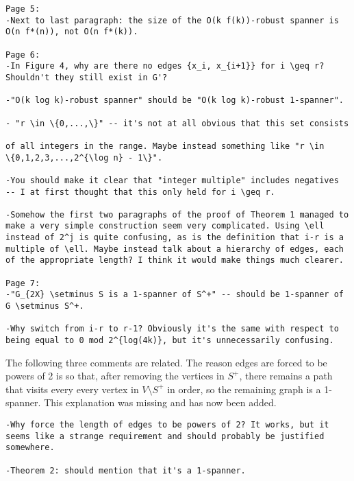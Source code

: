 \documentclass{patmorin}
\begin{document}
\begin{Verbatim}[frame=single]
Page 5:
-Next to last paragraph: the size of the O(k f(k))-robust spanner is
O(n f*(n)), not O(n f*(k)).

Page 6:
-In Figure 4, why are there no edges {x_i, x_{i+1}} for i \geq r?
Shouldn't they still exist in G'?

-"O(k log k)-robust spanner" should be "O(k log k)-robust 1-spanner".

- "r \in \{0,...,\}" -- it's not at all obvious that this set consists

of all integers in the range. Maybe instead something like "r \in
\{0,1,2,3,...,2^{\log n} - 1\}".

-You should make it clear that "integer multiple" includes negatives
-- I at first thought that this only held for i \geq r.

-Somehow the first two paragraphs of the proof of Theorem 1 managed to
make a very simple construction seem very complicated. Using \ell
instead of 2^j is quite confusing, as is the definition that i-r is a
multiple of \ell. Maybe instead talk about a hierarchy of edges, each
of the appropriate length? I think it would make things much clearer.

Page 7:
-"G_{2X} \setminus S is a 1-spanner of S^+" -- should be 1-spanner of
G \setminus S^+.

-Why switch from i-r to r-1? Obviously it's the same with respect to
being equal to 0 mod 2^{log(4k)}, but it's unnecessarily confusing.
\end{Verbatim}

The following three comments are related.  The reason edges are forced to be powers of 2 is so that, after removing the vertices in $S^+$, there remains a path that visits every every vertex in $V\setminus S^+$ in order, so the remaining graph is a 1-spanner.  This explanation was missing and has now been added.

\begin{Verbatim}[frame=single]
-Why force the length of edges to be powers of 2? It works, but it
seems like a strange requirement and should probably be justified
somewhere.

-Theorem 2: should mention that it's a 1-spanner.

-Proof of Theorem 2: stretch needs to be analyzed somewhere
\end{Verbatim}

The following comments from the referee have all been addressed:
\end{document}
